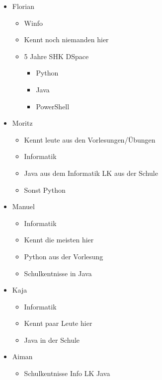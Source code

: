 \begin{itemize}
\tightlist
\item
  Florian

  \begin{itemize}
  \tightlist
  \item
    Winfo
  \item
    Kennt noch niemanden hier
  \item
    5 Jahre SHK DSpace

    \begin{itemize}
    \tightlist
    \item
      Python
    \item
      Java
    \item
      PowerShell
    \end{itemize}
  \end{itemize}
\item
  Moritz

  \begin{itemize}
  \tightlist
  \item
    Kennt leute aus den Vorlesungen/Übungen
  \item
    Informatik
  \item
    Java aus dem Informatik LK aus der Schule
  \item
    Sonst Python
  \end{itemize}
\item
  Manuel

  \begin{itemize}
  \tightlist
  \item
    Informatik
  \item
    Kennt die meisten hier
  \item
    Python aus der Vorlesung
  \item
    Schulkentnisse in Java
  \end{itemize}
\item
  Kaja

  \begin{itemize}
  \tightlist
  \item
    Informatik
  \item
    Kennt paar Leute hier
  \item
    Java in der Schule
  \end{itemize}
\item
  Aiman

  \begin{itemize}
  \tightlist
  \item
    Schulkentnisse Info LK Java


\end{itemize}
\end{itemize}
